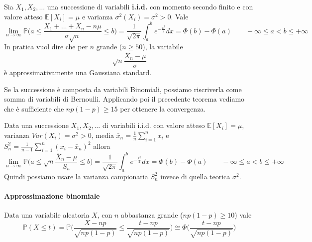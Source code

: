 \begin{theorem}
	Sia $X_1, X_2, \ldots$ una successione di variabili \textbf{i.i.d.} con momento secondo finito e con valore atteso $\mathbb{E}[X_i] = \mu$ e varianza $\sigma^2(X_i)=\sigma^2 > 0$. Vale
	\begin{equation}
		\lim_{n \to \infty} \mathbb{P} \bigg(a \leq \frac{X_1 + \ldots + X_n - n\mu}{\sigma \sqrt{n}} \leq b\bigg) = \frac{1}{\sqrt{2 \pi}} \int_{a}^{b}e^{-\frac{x^2}{2}}dx = \Phi(b) - \Phi(a) \quad\quad -\infty \leq a < b \leq + \infty
	\end{equation}
	In pratica vuol dire che per $n$ grande ($n \geq 50$), la variabile
	\begin{equation*}
		\label{eq:tcl}
		\sqrt{n}\frac{\bar{X}_n - \mu}{\sigma}
	\end{equation*}
	è approssimativamente una Gaussiana standard.
\end{theorem}

\begin{observation}
	Se la successione è composta da variabili Binomiali, possiamo riscriverla come somma di variabili di Bernoulli. Applicando poi il precedente teorema vediamo che è sufficiente che $np(1-p) \geq 15$ per ottenere la convergenza.
\end{observation}

\begin{proposition}
	Data una successione $X_1, X_2, \ldots$ di variabili i.i.d. con valore atteso $\mathbb{E}[X_i] = \mu$, varianza $Var(X_i)=\sigma^2 > 0$, media $\bar{x}_n = \frac{1}{n}\sum_{i=1}^{n}x_i$ e $S^2_n=\frac{1}{n-1}\sum_{i=1}^{n}(x_i-\bar{x}_n)^2$ allora
	\begin{equation}
		\lim_{n \to \infty}\mathbb{P} \bigg(a \leq \sqrt{n}\frac{\bar{X}_n - \mu}{S_n} \leq b\bigg) = \frac{1}{\sqrt{2 \pi}} \int_{a}^{b}e^{-\frac{x^2}{2}}dx = \Phi(b) - \Phi(a) \quad\quad -\infty \leq a < b \leq + \infty
	\end{equation}
	Quindi possiamo usare la varianza campionaria $S^2_n$ invece di quella teorica $\sigma^2$.
\end{proposition}

\paragraph{Approssimazione binomiale}
\begin{definition}
	Data una variabile aleatoria $X$, con $n$ abbastanza grande ($np(1-p)\geq10$) vale
	\begin{equation}
		\mathbb{P}(X \leq t)=\mathbb{P}\bigg(\frac{X - np}{\sqrt{np(1-p)}} \leq \frac{t-np}{\sqrt{np(1-p)}}\bigg) \cong \Phi\bigg(\frac{t-np}{\sqrt{np(1-p)}}\bigg)
	\end{equation}
\end{definition}